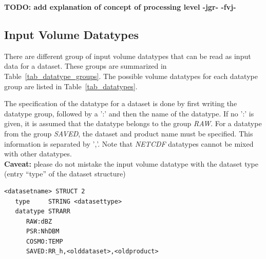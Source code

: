 \documentclass[a4paper,11pt,pdftex,twoside]{scrartcl}
\renewcommand{\bf}{\normalfont \bfseries}
\begin{document}
{{{{\bf TODO: add explanation of concept of processing level -jgr- -fvj- }


\subsection{Input Volume Datatypes}

There are different group of input volume datatypes that can be read as input data
for a dataset. These groups are summarized in Table~\ref{tab_datatype_groups}. The possible volume datatypes for each datatype group are listed in Table~\ref{tab_datatypes}.

The specification of the datatype for a dataset is done by first writing the datatype
group, followed by a ':' and then the name of the datatype. If no ':' is given, it is
assumed that the datatype belongs to the group \emph{RAW}.
For a datatype from the group \emph{SAVED}, the dataset and product name must be
specified. This information is separated by ','.
Note that \emph{NETCDF} datatypes cannot be mixed with other datatypes.\\

\noindent
{\bf Caveat:} please do not mistake the input volume datatype with the dataset type (entry  ``type'' of the dataset structure)
\begin{verbatim}
<datasetname> STRUCT 2
   type     STRING <datasettype>
   datatype STRARR
      RAW:dBZ
      PSR:NhDBM
      COSMO:TEMP
      SAVED:RR_h,<olddataset>,<oldproduct>
\end{verbatim}

}}}
\end{document}
